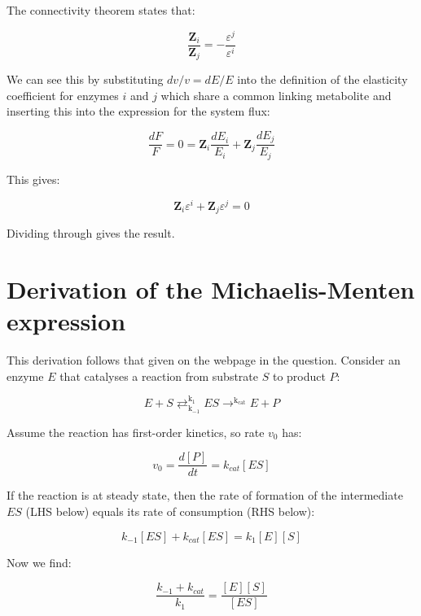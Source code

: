 \documentclass[11pt]{article} %
\begin{document}
The connectivity theorem states that:

\begin{equation}
\frac{\mathbf{Z}_{i}}{\mathbf{Z}_{j}} = -\frac{\varepsilon^{j}}{\varepsilon^{i}}
\end{equation}
 
We can see this by substituting $dv/v = dE/E$ into the definition of the elasticity coefficient for enzymes $i$ and $j$ which share a common linking metabolite and inserting this into the expression for the system flux:

\begin{equation}
\frac{dF}{F} = 0 = \mathbf{Z}_{i} \frac{dE_{i}}{E_{i}} + \mathbf{Z}_{j} \frac{dE_{j}}{E_{j}}
\end{equation}

This gives:

\begin{equation}
\mathbf{Z}_{i} \varepsilon^{i} + \mathbf{Z}_{j} \varepsilon^{j} = 0
\end{equation}

Dividing through gives the result.

\section{Derivation of the Michaelis-Menten expression}
This derivation follows that given on the webpage in the question. Consider an enzyme $E$ that catalyses a reaction from substrate $S$ to product $P$:

\begin{equation}
E + S \mathrel{\mathop{\rightleftarrows}^{\mathrm{k_{1}}}_{\mathrm{k_{-1}}}} ES \mathrel{\mathop{\rightarrow}^{\mathrm{k_{cat}}}} E + P
\end{equation}

Assume the reaction has first-order kinetics, so rate $v_{0}$ has:

\begin{equation}
v_{0} = \frac{d[P]}{dt} = k_{cat}[ES]
\end{equation}

If the reaction is at steady state, then the rate of formation of the intermediate $ES$ (LHS below) equals its rate of consumption (RHS below):

\begin{equation}
k_{-1}[ES] + k_{cat}[ES] = k_{1}[E][S]
\end{equation}

Now we find:

\begin{equation}
\frac{k_{-1} + k_{cat}}{k_{1}} = \frac{[E][S]}{[ES]}
\end{equation}
\end{document}
